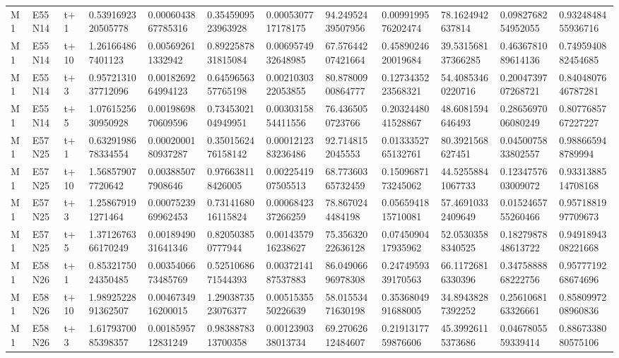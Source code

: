 \begin{landscape}
\begin{longtable}{llllllllllll}
M1 & E55N14 & t+1 & 0.5391692320505778 & 0.0006043867785316 & 0.3545909523963928 & 0.0005307717178175 & 94.24952439507956 & 0.0099199576202474 & 78.1624942637814 & 0.0982768254952055 & 0.9324848455936716 \\
M1 & E55N14 & t+10 & 1.261664867401123 & 0.005692611332942 & 0.8922587831815084 & 0.0069574932648985 & 67.57644207421664 & 0.4589024620019684 & 39.531568137366285 & 0.4636781089614136 & 0.7495940882454685 \\
M1 & E55N14 & t+3 & 0.9572131037712096 & 0.0018269264994123 & 0.6459656357765198 & 0.0021030322053855 & 80.87800900864777 & 0.1273435223568321 & 54.40853460220716 & 0.2004739707268721 & 0.8404807646787281 \\
M1 & E55N14 & t+5 & 1.0761525630950928 & 0.0019869870609596 & 0.7345302104949951 & 0.0030315854411556 & 76.4365050723766 & 0.2032448041528867 & 48.6081594646493 & 0.2865697006080249 & 0.8077685767227227 \\
M1 & E57N25 & t+1 & 0.6329198678334554 & 0.0002000180937287 & 0.3501562476158142 & 0.0001212383236486 & 92.7148152045553 & 0.0133352765132761 & 80.3921568627451 & 0.0450075833802557 & 0.988665948789994 \\
M1 & E57N25 & t+10 & 1.568579077720642 & 0.003885077908646 & 0.976638118426005 & 0.0022541907505513 & 68.77360365732459 & 0.1509687173245062 & 44.52558841067733 & 0.1234757603009072 & 0.9331388514708168 \\
M1 & E57N25 & t+3 & 1.258679191271464 & 0.0007523969962453 & 0.7314168016115824 & 0.0006842337266259 & 78.8670244484198 & 0.0565941815710081 & 57.46910332409649 & 0.0152465755260466 & 0.9571881997709673 \\
M1 & E57N25 & t+5 & 1.3712676366170249 & 0.0018949031641346 & 0.820503850777944 & 0.0014357916238627 & 75.35632022636128 & 0.0745090417935962 & 52.05303588340525 & 0.1827987848613722 & 0.9491894308221668 \\
M1 & E58N26 & t+1 & 0.8532175024350485 & 0.0035406673485769 & 0.5251068671544393 & 0.0037214187537883 & 86.04906696978308 & 0.2474959339170563 & 66.11726816330396 & 0.3475888868222756 & 0.9577719268674696 \\
M1 & E58N26 & t+10 & 1.9892522891362507 & 0.0046734916200015 & 1.2903873523076377 & 0.0051535550226639 & 58.01553471630198 & 0.3536804991688005 & 34.89438287392252 & 0.2561068163326661 & 0.8580997208960836 \\
M1 & E58N26 & t+3 & 1.6179370085398357 & 0.0018595712831249 & 0.9838878313700358 & 0.0012390338013734 & 69.27062612484607 & 0.2191317759876606 & 45.39926115373686 & 0.0467805559339414 & 0.8867338080575106 \\

\end{longtable}
\end{landscape}
